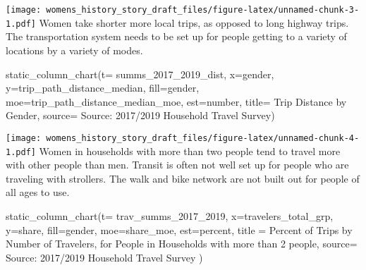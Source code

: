 \documentclass[
  12pt,
]{article}
\newenvironment{Shaded}{\begin{snugshade}}{\end{snugshade}}
\newcommand{\AttributeTok}[1]{\textcolor[rgb]{0.77,0.63,0.00}{#1}}
\newcommand{\FunctionTok}[1]{\textcolor[rgb]{0.00,0.00,0.00}{#1}}
\newcommand{\NormalTok}[1]{#1}
\newcommand{\StringTok}[1]{\textcolor[rgb]{0.31,0.60,0.02}{#1}}
\begin{document}
\texttt{[image: womens\_history\_story\_draft\_files/figure-latex/unnamed-chunk-3-1.pdf]}
Women take shorter more local trips, as opposed to long highway trips.
The transportation system needs to be set up for people getting to a
variety of locations by a variety of modes.

\begin{Shaded}
\begin{Highlighting}[]
\FunctionTok{static\_column\_chart}\NormalTok{(}\AttributeTok{t=}\NormalTok{ summs\_2017\_2019\_dist, }\AttributeTok{x=}\StringTok{\textquotesingle{}gender\textquotesingle{}}\NormalTok{, }\AttributeTok{y=}\StringTok{\textquotesingle{}trip\_path\_distance\_median\textquotesingle{}}\NormalTok{,  }\AttributeTok{fill=}\StringTok{\textquotesingle{}gender\textquotesingle{}}\NormalTok{, }\AttributeTok{moe=}\StringTok{\textquotesingle{}trip\_path\_distance\_median\_moe\textquotesingle{}}\NormalTok{, }\AttributeTok{est=}\StringTok{\textquotesingle{}number\textquotesingle{}}\NormalTok{, }\AttributeTok{title=}\StringTok{\textquotesingle{} Trip Distance by Gender\textquotesingle{}}\NormalTok{, }\AttributeTok{source=} \StringTok{\textquotesingle{}Source: 2017/2019 Household Travel Survey\textquotesingle{}}\NormalTok{)}
\end{Highlighting}
\end{Shaded}

\texttt{[image: womens\_history\_story\_draft\_files/figure-latex/unnamed-chunk-4-1.pdf]}
Women in households with more than two people tend to travel more with
other people than men. Transit is often not well set up for people who
are traveling with strollers. The walk and bike network are not built
out for people of all ages to use.

\begin{Shaded}
\begin{Highlighting}[]
\FunctionTok{static\_column\_chart}\NormalTok{(}\AttributeTok{t=}\NormalTok{ trav\_summs\_2017\_2019, }\AttributeTok{x=}\StringTok{\textquotesingle{}travelers\_total\_grp\textquotesingle{}}\NormalTok{, }\AttributeTok{y=}\StringTok{\textquotesingle{}share\textquotesingle{}}\NormalTok{,  }\AttributeTok{fill=}\StringTok{\textquotesingle{}gender\textquotesingle{}}\NormalTok{, }\AttributeTok{moe=}\StringTok{\textquotesingle{}share\_moe\textquotesingle{}}\NormalTok{, }\AttributeTok{est=}\StringTok{\textquotesingle{}percent\textquotesingle{}}\NormalTok{, }\AttributeTok{title =} \StringTok{\textquotesingle{}Percent of Trips by Number of Travelers, for People in Households with more than 2 people\textquotesingle{}}\NormalTok{,  }\AttributeTok{source=} \StringTok{\textquotesingle{}Source: 2017/2019 Household Travel Survey\textquotesingle{}}\NormalTok{ )}
\end{Highlighting}
\end{Shaded}
\end{document}
